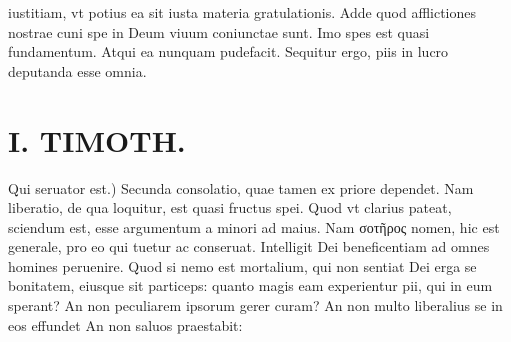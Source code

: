\documentclass{article}
\begin{document}
\begin{pages}
iustitiam, vt potius ea sit iusta materia gratulationis. Adde quod afflictiones nostrae cuni spe in Deum viuum coniunctae sunt. Imo spes est quasi fundamentum. Atqui ea nunquam pudefacit. Sequitur ergo, piis in lucro deputanda esse omnia.  \pend
\section*{I. TIMOTH. }
\marginpar{[ p.52 ]}\pstart Qui seruator est.) Secunda consolatio, quae tamen ex priore dependet. Nam liberatio, de qua loquitur, est quasi fructus spei. Quod vt clarius pateat, sciendum est, esse argumentum a minori ad maius. Nam σοτῆρος nomen, hic est generale, pro eo qui tuetur ac conseruat. Intelligit Dei beneficentiam ad omnes homines peruenire. Quod si nemo est mortalium, qui non sentiat Dei erga se bonitatem, eiusque sit particeps: quanto magis eam experientur pii, qui in eum sperant? An non peculiarem ipsorum gerer curam? An non multo liberalius se in eos effundet An non saluos praestabit:  \pend
{}
{}

\end{pages}
\end{document}
